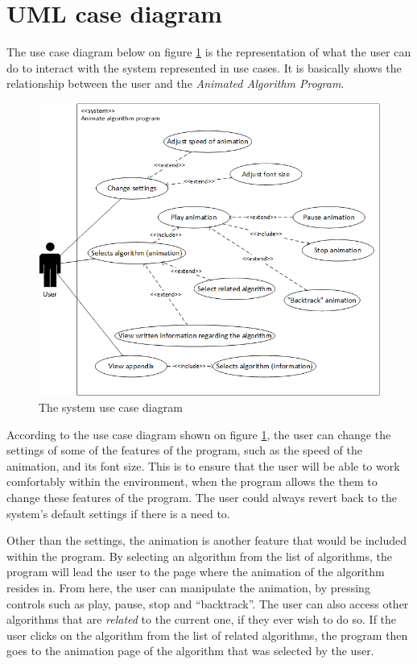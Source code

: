 \newpage

\section{UML case diagram}
The use case diagram below on figure \ref{useCaseDiagram} is the representation of what the user can do to interact with the system represented in use cases. It is basically shows the relationship between the user and the \textit{Animated Algorithm Program}.

\begin{figure}[H]
\centering
\hspace*{-1cm}
\includegraphics[scale=1]{images/report_images/useCaseDiagram.png}
\caption{The system use case diagram}
\label{useCaseDiagram}
\end{figure}

According to the use case diagram shown on figure \ref{useCaseDiagram}, the user can change the settings of some of the features of the program, such as the speed of the animation, and its font size. This is to ensure that the user will be able to work comfortably within the environment, when the program allows the them to change these features of the program. The user could always revert back to the system's default settings if there is a need to.

Other than the settings, the animation is another feature that would be included within the program. By selecting an algorithm from the list of algorithms, the program will lead the user to the page where the animation of the algorithm resides in. From here, the user can manipulate the animation, by pressing controls such as play, pause, stop and ``backtrack''. The user can also access other algorithms that are \textit{related} to the current one, if they ever wish to do so. If the user clicks on the algorithm from the list of related algorithms, the program then goes to the animation page of the algorithm that was selected by the user.

